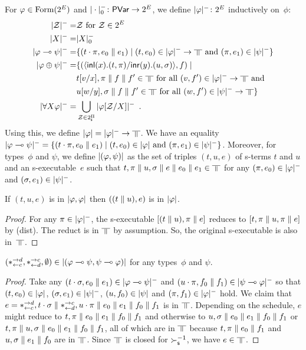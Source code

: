 For $\varphi\in\mathop{\text{Form}}(2^E)$ and $|\cdot|^-_0\colon\mathsf{PVar}\rightarrow 2^E$,
we define $|{\varphi}|^-\colon
2^E$ inductively on~$\phi$:
\begin{align*}
 \nsem{\mathcal Z} =& \mathcal Z \text{ for } \mathcal Z\in 2^E\\
 \nsem{X}=& |X|_0^- \\
 \nsem{\phi\limp\psi}=&
 \{(t\cdot\pi, e_0\conc e_1)\mid
 (t,e_0)\in\nsem\phi\rightarrow\bbot \text{ and }(\pi,e_1)\in\nsem\psi\}\\
 \nsem{\phi\oplus\psi}=& \{(\mats x{t}{\pi}y{u}{\sigma}, f)\mid\\ &
 t[v/x],\pi\conc f\conc f'\in\bbot \text{ for all } (v,f')\in\nsem{\phi}\rightarrow\bbot\text{
 and }\\ &
 u[w/y],\sigma\conc f\conc f'\in\bbot \text{ for all } (w,f')\in\nsem{\psi}\rightarrow\bbot\}
 \\
 \nsem{\forall X\phi}=&
 \bigcup_{\mathcal Z\in 2^\sPi} \nsem{\phi[\mathcal Z/X]}\enspace.
\end{align*}
Using this, we define $\sem \phi=\nsem{\phi}\rightarrow\bbot$.
We have an equality
$|{\varphi\multimap\psi}|^- = \{(t\cdot\pi, e_0\parallel e_1)\mid
(t,e_0)\in|{\varphi}|\text{ and }(\pi,e_1)\in|{\psi}|^-\}$.
Moreover, for types~$\phi$ and $\psi$, we define $|{(\varphi,\psi)}|$
as the set of triples $(t,u,e)$ of s-terms $t$ and $u$ and an s-executable~$e$
such
that
$t,\pi\conc u,\sigma\conc e\conc e_0\conc e_1
\in\bbot$ for any $(\pi,e_0)\in|{\varphi}|^-$
and $(\sigma,e_1)\in|{\psi}|^-$.

\begin{proposition}
 \label{squash}
 If $(t,u,e)$ is in $|{\varphi,\varphi}|$ then $((t\parallel u), e)$ is in
 $|{\varphi}|$.
\end{proposition}
\begin{proof}
 For any $\pi\in|{\varphi}|^-$,
 the s-executable $[(t\parallel u),\pi\parallel e]$ reduces to $[t,\pi\parallel
 u,\pi\parallel e]$ by (dist).
 The reduct is in $\bbot$ by assumption.
 So, the original s-executable is also in~$\bbot$.
\end{proof}

\begin{proposition}
 \label{comod-type}
 $(\ast^{\rightarrow {d}}_{\leftarrow{c}},\ast^{\rightarrow {c}}_{\leftarrow{d}},\emptyset)\in|{(\varphi\multimap\psi,\psi\multimap\varphi)}|$
 for any types~$\phi$ and $\psi$.
\end{proposition}
\begin{proof}
 Take any $(t\cdot\sigma,e_{0}\parallel e_{1})\in|{\varphi\multimap\psi}|^-$
 and $(u\cdot\pi,f_{0}\parallel f_{1})\in|{\psi\multimap\varphi}|^-$ so that
 $(t, e_{0})\in|{\varphi}|$, $(\sigma,e_{1})\in|{\psi}|^-$,
 $(u, f_{0})\in|{\psi}|$ and $(\pi,f_{1})\in|{\varphi}|^-$ hold.
 We claim that $e=\ast^{\rightarrow {d}}_{\leftarrow{c}},t\cdot\sigma\parallel\ast^{\rightarrow {c}}_{\leftarrow{d}},u\cdot\pi\parallel
 e_{0}\parallel e_{1}\parallel f_{0}\parallel f_{1}$ is in
 $\bbot$.
 Depending on the schedule, $e$ might reduce to
 $ t,\pi\parallel e_{0}\parallel e_{1}\parallel f_{0}\parallel f_{1}$ and otherwise to
 $ u,\sigma\parallel e_{0}\parallel e_{1}\parallel f_{0}\parallel f_{1}$ or
 $ t,\pi\parallel u,\sigma\parallel e_{0}\parallel e_{1}\parallel f_{0}\parallel f_{1}$,
 all of which are in $\bbot$ because
 $t,\pi\parallel e_{0}\parallel f_{1}$ and
 $u,\sigma\parallel e_{1}\parallel f_{0}$ are in $\bbot$.
 Since $\bbot$ is closed for $\succ_{\mathsf s}^{-1}$,
 we have $e\in\bbot$.
\end{proof}

